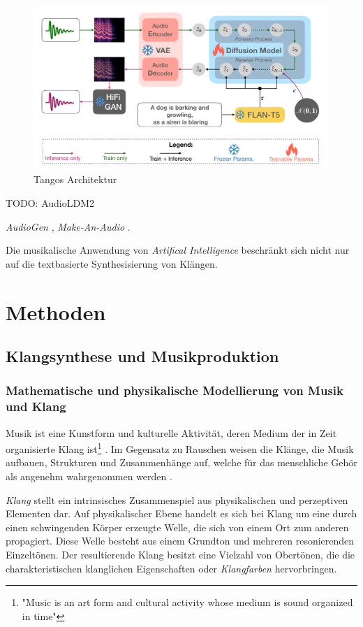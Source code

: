 \documentclass[
  a4paper,  %
  twoside,  %
  bibliography=totoc,
  headsepline,
  cleardoublepage=empty,
  parskip=half,
  draft=false
]{scrbook}
\begin{document}
\begin{figure}[h]
  \centering
  \includegraphics[width=.7\textwidth]{graphics/Tango.png}
  \caption[Tango Architektur]{Tangos Architektur \cite{liu_roberta_2019}}
  \label{fig:tango}
\end{figure}

TODO: AudioLDM2 

\emph{AudioGen} \cite{kreuk_audiogen_2023}, \emph{Make-An-Audio} \cite{huang_make--audio_2023}.


Die musikalische Anwendung von \emph{Artifical Intelligence} beschränkt sich nicht nur auf die textbasierte Synthesisierung von Klängen.







\chapter{Methoden}

\section{Klangsynthese und Musikproduktion}

\subsection{Mathematische und physikalische Modellierung von Musik und Klang}\label{sec:music_math}
\glqq Musik ist eine Kunstform und kulturelle Aktivität, deren Medium der in Zeit organisierte Klang ist\grqq \footnote{"Music is an art form and cultural activity whose medium is sound organized in time"} \cite{tsuji_physics_2021}. Im Gegensatz zu Rauschen weisen die Klänge, die Musik aufbauen, Strukturen und Zusammenhänge auf, welche für das menschliche Gehör als angenehm wahrgenommen werden \cite{parker_good_2009}. 

\emph{Klang} stellt ein intrinsisches Zusammenspiel aus physikalischen und perzeptiven Elementen dar. Auf physikalischer Ebene handelt es sich bei Klang um eine durch einen schwingenden Körper erzeugte Welle, die sich von einem Ort zum anderen propagiert. Diese Welle besteht aus einem Grundton und mehreren resonierenden Einzeltönen. Der resultierende Klang besitzt eine Vielzahl von Obertönen, die die charakteristischen klanglichen Eigenschaften oder \emph{Klangfarben} hervorbringen. \cite{tsuji_physics_2021, parker_good_2009}
\end{document}
